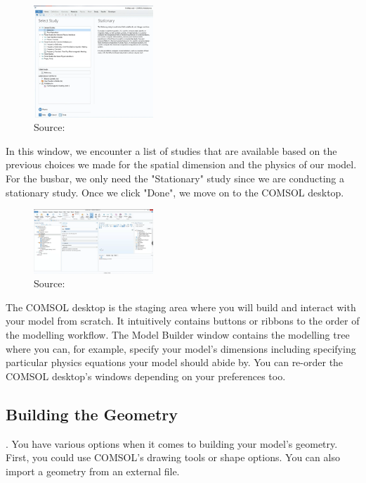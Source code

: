 \begin{figure}[ht!]
  \centering
  \includegraphics[width=0.4\textwidth]{Chapters/Figures/Chapter 3 Figures/Select Study.png}
  \caption{ Source: \cite{}}
  \label{}
\end{figure}

In this window, we encounter a list of studies that are available based on the previous choices we made for the spatial dimension and the physics of our model. For the busbar, we only need the "Stationary" study since we are conducting a stationary study. Once we click "Done", we move on to the COMSOL desktop.

\begin{figure}[ht!]
  \centering
  \includegraphics[width=0.4\textwidth]{Chapters/Figures/Chapter 3 Figures/Initial COMSOL Desktop.png}
  \caption{ Source: \cite{}}
  \label{}
\end{figure}

The COMSOL desktop is the staging area where you will build and interact with your model from scratch. It intuitively contains buttons or ribbons to the order of the modelling workflow. The Model Builder window contains the modelling tree where you can, for example, specify your model's dimensions including specifying particular physics equations your model should abide by. You can re-order the COMSOL desktop's windows depending on your preferences too.

\subsection{Building the Geometry}.
You have various options when it comes to building your model's geometry. First, you could use COMSOL's drawing tools or shape options. You can also import a geometry from an external file.

